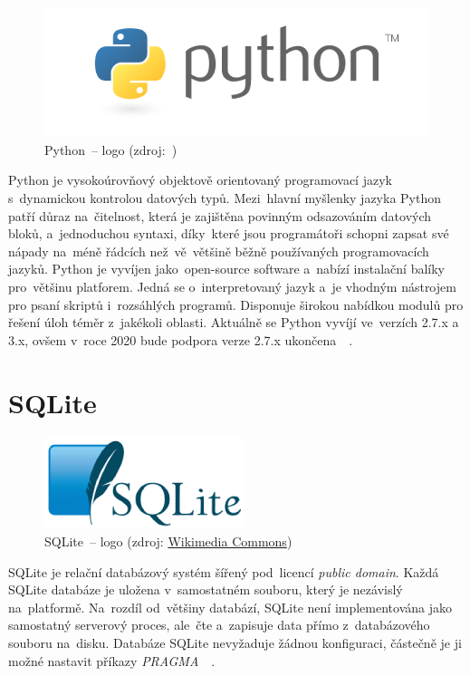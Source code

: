 	\begin{figure}[H]
		\centering
		\includegraphics[width=.5\textwidth]{./pictures/python_logo.png}
      	\caption[Python~– logo]{Python~– logo (zdroj:~\citep{python})}
		\label{fig:python_logo}
 	\end{figure}

Python je vysokoúrovňový objektově orientovaný programovací jazyk s~dynamickou kontrolou datových typů. Mezi~hlavní myšlenky jazyka Python patří důraz na~čitelnost, která je zajištěna povinným odsazováním datových bloků, a~jednoduchou syntaxi, díky~které jsou programátoři schopni zapsat své nápady na~méně řádcích než~vě~většině běžně používaných programovacích jazyků. Python je vyvíjen jako~open-source software a~nabízí instalační balíky pro~většinu platforem. Jedná se o~interpretovaný jazyk a~je vhodným nástrojem pro psaní skriptů i~rozsáhlých programů. Disponuje širokou nabídkou modulů pro řešení úloh téměr z~jakékoli oblasti. Aktuálně se Python vyvíjí ve~verzích 2.7.x a 3.x, ovšem v~roce 2020 bude podpora verze 2.7.x ukončena~\citep{python}~\citep{wiki_python}.

\section{SQLite}
\label{sqlite}

	\begin{figure}[H]
		\centering
		\includegraphics[width=.2\textwidth]{./pictures/sqlite_logo.png}
      	\caption[SQLite~– logo]{SQLite~– logo (zdroj: \href{https://commons.wikimedia.org/wiki/File:SQLite_Logo_4.png}{Wikimedia Commons})}
		\label{fig:sqlite_logo}
 	\end{figure}

SQLite je relační databázový systém šířený pod~licencí \textit{public domain}. Každá SQLite databáze je uložena v~samostatném souboru, který je nezávislý na~platformě. Na~rozdíl od~většiny databází, SQLite není implementována jako samostatný serverový proces, ale~čte a~zapisuje data přímo z~databázového souboru na~disku. Databáze SQLite nevyžaduje žádnou konfiguraci, částečně je ji možné nastavit příkazy \textit{PRAGMA}~\citep{sqlite}~\citep{wiki_sqlite}.

